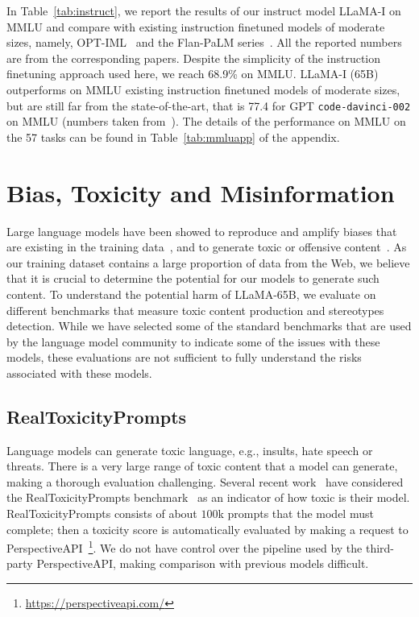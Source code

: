 \documentclass[11pt]{article}
\newcommand{\model}{LLaMA\xspace}
\begin{document}
In Table~\ref{tab:instruct}, we report the results of our instruct model \model-I on MMLU and compare with existing instruction finetuned models of moderate sizes, namely, OPT-IML~\cite{iyer2022opt} and the Flan-PaLM series~\cite{Chung2022ScalingIL}. 
All the reported numbers are from the corresponding papers.
Despite the simplicity of the instruction finetuning approach used here, we reach 68.9\% on MMLU.
\model-I (65B) outperforms on MMLU existing instruction finetuned models of moderate sizes, but are still far from the state-of-the-art, that is 77.4 for GPT \texttt{code-davinci-002} on MMLU (numbers taken from~\citet{iyer2022opt}).
The details of the performance on MMLU on the 57 tasks can be found in Table~\ref{tab:mmluapp} of the appendix.

\section{Bias, Toxicity and Misinformation}

Large language models have been showed to reproduce and amplify biases that are existing in the training data~\citep{sheng2019woman,kurita2019quantifying}, and to generate toxic or offensive content~\citep{gehman2020realtoxicityprompts}.
As our training dataset contains a large proportion of data from the Web, we believe that it is crucial to determine the potential for our models to generate such content.
To understand the potential harm of \model-65B, we evaluate on different benchmarks that measure toxic content production and stereotypes detection.
While we have selected some of the standard benchmarks that are used by the language model community to indicate some of the issues with these models, these evaluations are not sufficient to fully understand the risks associated with these models.

\subsection{RealToxicityPrompts}

Language models can generate toxic language, e.g.,  insults, hate speech or threats.
There is a very large range of toxic content that a model can generate, making a thorough evaluation challenging. 
Several recent work~\cite{zhang2022opt, hoffmann2022chinchilla} have considered the RealToxicityPrompts benchmark~\cite{gehman2020realtoxicityprompts} as an indicator of how toxic is their model.
RealToxicityPrompts consists of about $100$k prompts that the model must complete; then a toxicity score is automatically evaluated by making a request to PerspectiveAPI~\footnote{\url{https://perspectiveapi.com/}}. 
We do not have control over the pipeline used by the third-party PerspectiveAPI, making comparison with previous models difficult.
\end{document}
